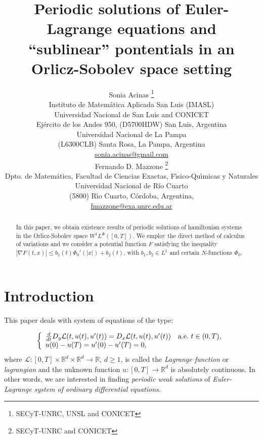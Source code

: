 \documentclass[twoside]{article}
\title{Periodic solutions of 
Euler-Lagrange equations and ``sublinear'' pontentials   in an Orlicz-Sobolev space setting }
\author{Sonia Acinas \thanks{SECyT-UNRC, UNSL and CONICET}\\
Instituto de Matem\'atica Aplicada San Luis (IMASL)\\ 
Universidad Nacional de San Luis and CONICET\\
Ej\'ercito de los Andes 950,
(D5700HDW) San Luis, Argentina\\
Universidad Nacional de La Pampa\\
(L6300CLB) Santa Rosa, La Pampa, Argentina\\
\url{sonia.acinas@gmail.com}\\[3mm]
Fernando D. Mazzone \thanks{SECyT-UNRC and CONICET}\\
Dpto. de Matem\'atica, Facultad de Ciencias Exactas, F\'{\i}sico-Qu\'{\i}micas y Naturales\\
Universidad Nacional de R\'{i}o Cuarto\\
(5800) R\'{\i}o Cuarto, C\'ordoba, Argentina,\\
\url{fmazzone@exa.unrc.edu.ar}
}
\date{}
\theoremstyle{remark}
\newcommand{\lphi}{L^{\Phi}}
\newcommand{\wphi}{W^{1}\lphi}
\newcommand{\rr}{\mathbb{R}}
\renewcommand{\leq}{\leqslant}
\renewcommand{\geq}{\geqslant}
\begin{document}
\maketitle
%
\begingroup%
    \renewcommand{\thefootnote}{}%
    \endgroup
%
%
%
%

\begin{abstract}

In this paper, we obtain existence results of periodic solutions of hamiltonian systems in the Orlicz-Sobolev space $\wphi([0,T])$.
We employ the direct method of calculus of variations and we consider  a potential  function $F$ satisfying the inequality  
$|\nabla F(t,x)|\leq b_1(t) \Phi_0'(|x|)+b_2(t)$, with  $b_1, b_2\in L^1$ and  certain $N$-functions $\Phi_0$. 
\end{abstract}




\pagestyle{fancy} \headheight 35pt \fancyhead{} \fancyfoot{}

\fancyfoot[C]{\thepage}  \fancyhead[CO]{\nouppercase{\section}}

\fancyhead[CO]{\nouppercase{\leftmark}}






\section{Introduction}
This paper deals with system  of equations of the type:

\begin{equation}\label{ProbPrin-gral}
    \left\{%
\begin{array}{ll}
  \frac{d}{dt} D_{y}\mathcal{L}(t,u(t),u'(t))= D_{x}\mathcal{L}(t,u(t),u'(t)) \quad \hbox{a.e.}\ t \in (0,T),\\
    u(0)-u(T)=u'(0)-u'(T)=0,
\end{array}%
\right.
\end{equation}
where $\mathcal{L}:[0,T]\times\rr^d\times\rr^d\to\rr$, $d\geq 1$, is called the \emph{Lagrange function} or \emph{lagrangian} and the unknown function  $u:[0,T]\to\rr^d$ is absolutely continuous. In other words, we are interested in  finding \emph{periodic weak solutions} of \emph{Euler-Lagrange system of ordinary differential equations}. 
\end{document}

